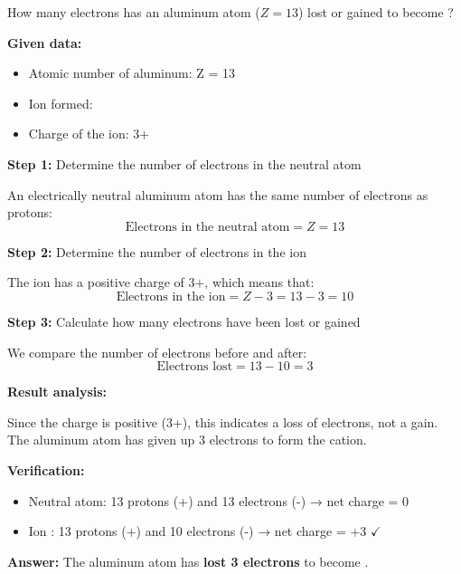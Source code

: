 \begin{exercise}
    How many electrons has an aluminum atom (\( Z = 13 \)) lost or gained to become ?
    \begin{solu}
        \textbf{Given data:}
        \begin{itemize}
            \item Atomic number of aluminum: Z = 13
            \item Ion formed: 
            \item Charge of the ion: 3+
        \end{itemize}

        \textbf{Step 1:} Determine the number of electrons in the neutral atom

        An electrically neutral aluminum atom has the same number of electrons as protons:
        \[
            \text{Electrons in the neutral atom} = Z = 13
        \]

        \textbf{Step 2:} Determine the number of electrons in the ion

        The  ion has a positive charge of 3+, which means that:
        \[
            \text{Electrons in the ion} = Z - 3 = 13 - 3 = 10
        \]

        \textbf{Step 3:} Calculate how many electrons have been lost or gained

        We compare the number of electrons before and after:
        \[
            \text{Electrons lost} = 13 - 10 = 3
        \]

        \textbf{Result analysis:}

        Since the charge is positive (3+), this indicates a loss of electrons, not a gain. The aluminum atom has given up 3 electrons to form the  cation.

        \textbf{Verification:}
        \begin{itemize}
            \item Neutral atom: 13 protons (+) and 13 electrons (-) → net charge = 0
            \item Ion : 13 protons (+) and 10 electrons (-) → net charge = +3 \( \checkmark \)
        \end{itemize}

        \textbf{Answer:} The aluminum atom has \textbf{lost 3 electrons} to become .
    \end{solu}
\end{exercise}
